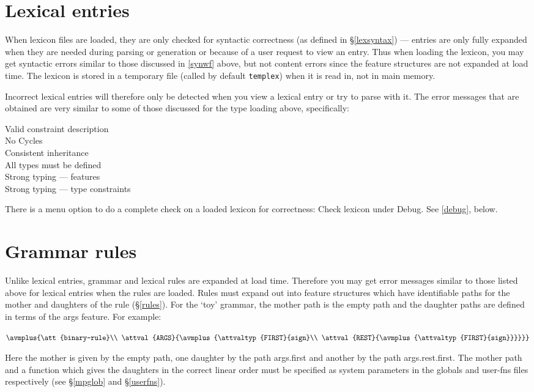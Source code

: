\documentclass[12pt]{report}
\newcommand{\filename}[1]{{\tt #1}}
\newcommand{\lkbmenucommand}{{\bf}}
\begin{document}
\section{Lexical entries}

When lexicon files are loaded, they are only checked for syntactic correctness 
(as defined in \S\ref{lexsyntax})
--- entries are only fully expanded when they are needed
during parsing or generation
or because of a user request to view an entry.  Thus when loading
the lexicon, you may get syntactic errors similar to those discussed
in \ref{synwf} above, but not content errors since
the feature structures are not expanded
at load time. 
The lexicon is
stored in a temporary file (called by default \filename{templex}) when it
is read in, not in main memory.  

Incorrect lexical entries will therefore only be detected when you view a 
lexical entry or try to parse with it.  The error messages
that are obtained are very similar to some of those discussed for the
type loading above, specifically: 
\begin{description}
\item[Valid constraint description] 
\item[No Cycles]
\item[Consistent inheritance]
\item[All types must be defined]
\item[Strong typing --- features]
\item[Strong typing --- type constraints]
\end{description}

There is a menu option to 
do a complete check on a loaded lexicon for correctness:
{\lkbmenucommand Check lexicon} under {\lkbmenucommand Debug}.  See \ref{debug}, below.

\section{Grammar rules}

Unlike lexical entries, grammar and lexical rules are expanded at load time.
Therefore you may get error messages similar to those listed
above for lexical entries when the rules are loaded.
Rules must expand out into feature structures which have identifiable paths
for the mother and daughters of the rule (\S\ref{rules}).  For the `toy'
grammar, the mother path is the empty path and the daughter
paths are defined in terms of the {\feature args} feature.  For example:
\begin{center}
{\tiny
   $\avmplus{\att{binary-rule}\\
             \attval{ARGS}{\avmplus{\attvaltyp{FIRST}{sign}\\
                                    \attval{REST}{\avmplus{\attvaltyp{FIRST}{sign}}}}}}$}
\end{center}
Here the mother is given by the empty path, one daughter 
by the path {\feature args}.{\feature first} and another by the path
{\feature args}.{\feature rest}.{\feature first}.  
The mother path and a function which gives the
daughters in the correct linear order must be specified as system parameters
in the globals and user-fns files respectively (see \S\ref{mpglob} and
\S\ref{userfns}).
\end{document}
